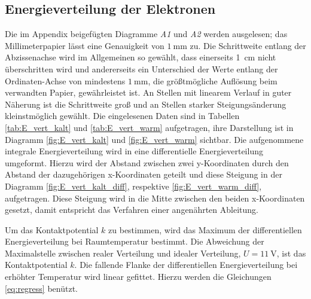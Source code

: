 \subsection{Energieverteilung der Elektronen} %
\label{sec:energiespektren}
Die im Appendix beigefügten Diagramme \emph{A1} und \emph{A2} werden ausgelesen;
das Millimeterpapier lässt eine Genauigkeit von $\SI{1}{\milli\meter}$ zu.
Die Schrittweite entlang der Abzissenachse wird im Allgemeinen so gewählt, dass einerseits \SI{1}{\centi\meter} nicht überschritten wird und 
andererseits ein Unterschied der Werte entlang der Ordinaten-Achse von mindestens $\SI{1}{\milli\meter}$, die größtmögliche Auflösung beim verwandten Papier, gewährleistet ist.
An Stellen mit linearem Verlauf in guter Näherung ist die Schrittweite groß und an Stellen starker Steigungsänderung kleinstmöglich gewählt.
Die eingelesenen Daten sind in Tabellen \ref{tab:E_vert_kalt} und \ref{tab:E_vert_warm} aufgetragen, ihre Darstellung ist in Diagramm \ref{fig:E_vert_kalt} und \ref{fig:E_vert_warm} sichtbar.
Die aufgenommene integrale Energieverteilung wird in eine differentielle Energieverteilung umgeformt.
Hierzu wird der Abstand zwischen zwei y-Koordinaten durch den Abstand der dazugehörigen x-Koordinaten geteilt und diese Steigung in der Diagramm \ref{fig:E_vert_kalt_diff}, respektive \ref{fig:E_vert_warm_diff}, aufgetragen. 
Diese Steigung wird in die Mitte zwischen den beiden x-Koordinaten gesetzt, damit entspricht das Verfahren einer angenährten Ableitung.

Um das Kontaktpotential $k$ zu bestimmen, wird das Maximum der differentiellen Energieverteilung bei Raumtemperatur bestimmt.
Die Abweichung der Maximalstelle zwischen realer Verteilung und idealer Verteilung, $U=\SI{11}{\volt}$, ist das Kontaktpotential $k$.
Die fallende Flanke der differentiellen Energieverteilung bei erhöhter Temperatur wird linear gefittet.
Hierzu werden die Gleichungen \ref{eq:regress} benützt.

